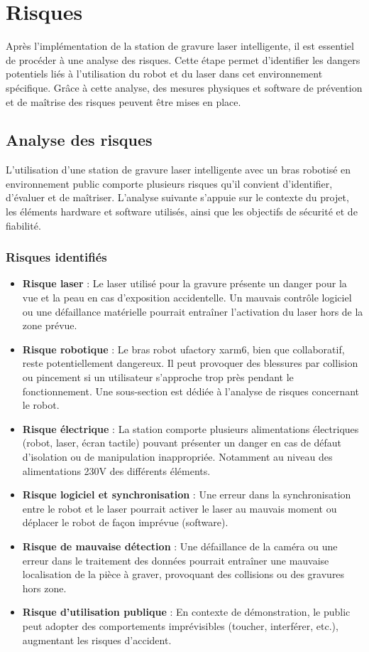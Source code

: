 \chapter{Risques}
\label{chap:risques}

Après l'implémentation de la station de gravure laser intelligente, il est essentiel de procéder à une analyse des risques. Cette étape permet d'identifier les dangers potentiels liés à l'utilisation du robot et du laser dans cet environnement spécifique. Grâce à cette analyse, des mesures physiques et \gls{software} de prévention et de maîtrise des risques peuvent être mises en place.

\section{Analyse des risques}
L'utilisation d'une station de gravure laser intelligente avec un bras robotisé en environnement public comporte plusieurs risques qu'il convient d'identifier, d'évaluer et de maîtriser. L'analyse suivante s'appuie sur le contexte du projet, les éléments \gls{hardware} et \gls{software} utilisés, ainsi que les objectifs de sécurité et de fiabilité.

\subsection{Risques identifiés}
\begin{itemize}
    \item \textbf{Risque laser} : Le laser utilisé pour la gravure présente un danger pour la vue et la peau en cas d'exposition accidentelle. Un mauvais contrôle logiciel ou une défaillance matérielle pourrait entraîner l'activation du laser hors de la zone prévue.
    \item \textbf{Risque robotique} : Le bras robot \gls{ufactory} \gls{xarm6}, bien que collaboratif, reste potentiellement dangereux. Il peut provoquer des blessures par collision ou pincement si un utilisateur s'approche trop près pendant le fonctionnement. Une sous-section est dédiée à l'analyse de risques concernant le robot.
    \item \textbf{Risque électrique} : La station comporte plusieurs alimentations électriques (robot, laser, écran tactile) pouvant présenter un danger en cas de défaut d'isolation ou de manipulation inappropriée. Notamment au niveau des alimentations 230V des différents éléments.
    \item \textbf{Risque logiciel et synchronisation} : Une erreur dans la synchronisation entre le robot et le laser pourrait activer le laser au mauvais moment ou déplacer le robot de façon imprévue (\gls{software}).
    \item \textbf{Risque de mauvaise détection} : Une défaillance de la caméra ou une erreur dans le traitement des données pourrait entraîner une mauvaise localisation de la pièce à graver, provoquant des collisions ou des gravures hors zone.
    \item \textbf{Risque d'utilisation publique} : En contexte de démonstration, le public peut adopter des comportements imprévisibles (toucher, interférer, etc.), augmentant les risques d'accident.
\end{itemize}

